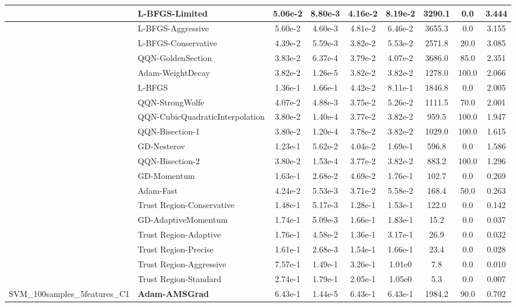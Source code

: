 \documentclass[10pt]{article}
\begin{document}
\begin{longtable}{|l|l|c|c|c|c|c|c|c|}
\hline
 & L-BFGS-Limited & 5.06e-2 & 8.80e-3 & 4.16e-2 & 8.19e-2 & 3290.1 & 0.0 & 3.444 \\
\hline
 & L-BFGS-Aggressive & 5.60e-2 & 4.60e-3 & 4.81e-2 & 6.46e-2 & 3655.3 & 0.0 & 3.155 \\
\hline
 & L-BFGS-Conservative & 4.39e-2 & 5.59e-3 & 3.82e-2 & 5.53e-2 & 2571.8 & 20.0 & 3.085 \\
\hline
 & QQN-GoldenSection & 3.83e-2 & 6.37e-4 & 3.79e-2 & 4.07e-2 & 3686.0 & 85.0 & 2.351 \\
\hline
 & Adam-WeightDecay & 3.82e-2 & 1.26e-5 & 3.82e-2 & 3.82e-2 & 1278.0 & 100.0 & 2.066 \\
\hline
 & L-BFGS & 1.36e-1 & 1.66e-1 & 4.42e-2 & 8.11e-1 & 1846.8 & 0.0 & 2.005 \\
\hline
 & QQN-StrongWolfe & 4.07e-2 & 4.88e-3 & 3.75e-2 & 5.26e-2 & 1111.5 & 70.0 & 2.001 \\
\hline
 & QQN-CubicQuadraticInterpolation & 3.80e-2 & 1.40e-4 & 3.77e-2 & 3.82e-2 & 959.5 & 100.0 & 1.947 \\
\hline
 & QQN-Bisection-1 & 3.80e-2 & 1.20e-4 & 3.78e-2 & 3.82e-2 & 1029.0 & 100.0 & 1.615 \\
\hline
 & GD-Nesterov & 1.23e-1 & 5.62e-2 & 4.04e-2 & 1.69e-1 & 596.8 & 0.0 & 1.586 \\
\hline
 & QQN-Bisection-2 & 3.80e-2 & 1.53e-4 & 3.77e-2 & 3.82e-2 & 883.2 & 100.0 & 1.296 \\
\hline
 & GD-Momentum & 1.63e-1 & 2.68e-2 & 4.69e-2 & 1.76e-1 & 102.7 & 0.0 & 0.269 \\
\hline
 & Adam-Fast & 4.24e-2 & 5.53e-3 & 3.71e-2 & 5.58e-2 & 168.4 & 50.0 & 0.263 \\
\hline
 & Trust Region-Conservative & 1.48e-1 & 5.17e-3 & 1.28e-1 & 1.53e-1 & 122.0 & 0.0 & 0.142 \\
\hline
 & GD-AdaptiveMomentum & 1.74e-1 & 5.09e-3 & 1.66e-1 & 1.83e-1 & 15.2 & 0.0 & 0.037 \\
\hline
 & Trust Region-Adaptive & 1.76e-1 & 4.58e-2 & 1.36e-1 & 3.17e-1 & 26.9 & 0.0 & 0.032 \\
\hline
 & Trust Region-Precise & 1.61e-1 & 2.68e-3 & 1.54e-1 & 1.66e-1 & 23.4 & 0.0 & 0.028 \\
\hline
 & Trust Region-Aggressive & 7.57e-1 & 1.49e-1 & 3.26e-1 & 1.01e0 & 7.8 & 0.0 & 0.010 \\
\hline
 & Trust Region-Standard & 2.74e-1 & 1.79e-1 & 2.05e-1 & 1.05e0 & 5.3 & 0.0 & 0.007 \\
SVM\_100samples\_5features\_C1 & \textbf{Adam-AMSGrad} & 6.43e-1 & 1.44e-5 & 6.43e-1 & 6.43e-1 & 1984.2 & 90.0 & 0.702 \\

\end{longtable}
\end{document}
